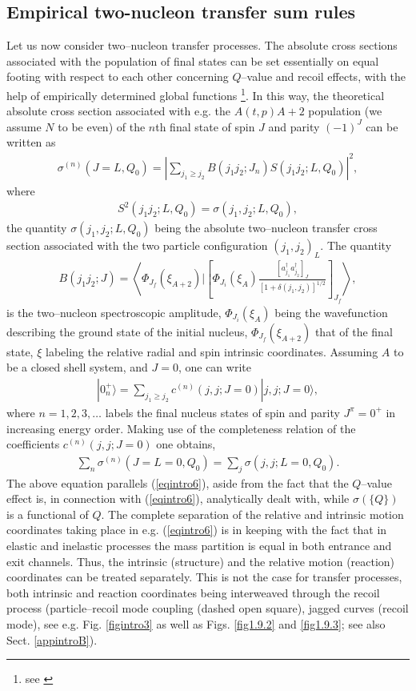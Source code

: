 \subsection{Empirical two-nucleon transfer sum rules}\label{S2.2.1}
Let us now consider two--nucleon transfer  processes. The  absolute cross sections associated with the population of  final states can be set essentially on equal footing with respect to each other  concerning  $Q$--value and recoil effects, with the help of empirically determined global functions \footnote{see \cite{Broglia:72b}}. In this way, the theoretical absolute cross section associated with e.g. the $A(t,p)A+2$ population (we assume $N$ to be even) of the $n$th final state of spin $J$ and parity $(-1)^J$ can be written as 
\begin{align}
\sigma^{(n)}(J=L,Q_0)=\left|\sum_{j_1\geq j_2}B(j_1 j_2;J_n)S(j_1 j_2 ;L,Q_0)\right|^2,
\end{align}
where
\begin{align}
S^2(j_1 j_2 ;L,Q_0)=\sigma(j_1,j_2;L,Q_0),
\end{align}
the quantity $\sigma(j_1,j_2;L,Q_0)$ being the absolute two--nucleon transfer cross section associated with the two particle configuration $(j_1,j_2)_L$.
The quantity
\begin{align}
B(j_1j_2;J)=\left\langle \Phi_{J_f}(\xi_{A+2})|\left[\Phi_{J_i}(\xi_A)\frac{\left[a^\dagger_{j_1}a^\dagger_{j_2}\right]_J}{\left[1+\delta(j_1,j_2)\right]^{1/2}}\right]_{J_f}\right\rangle,
\end{align}
is the two--nucleon spectroscopic amplitude, $\Phi_{J_i}(\xi_A)$ being the wavefunction describing the ground state of the initial nucleus, $\Phi_{J_f}(\xi_{A+2})$ that of the final state, $\xi$ labeling the relative radial and spin intrinsic coordinates. Assuming $A$ to be a closed shell system, and $J=0$, one can write
\begin{align}
|0^+_n\rangle=\sum_{j_1\geq j_2}c^{(n)}(j,j;J=0)|j,j;J=0\rangle,
\end{align}
where $n=1,2,3,\dots$ labels the final nucleus states of spin and parity $J^\pi=0^+$ in increasing energy order. Making use of the completeness relation of the coefficients $c^{(n)}(j,j;J=0)$ one obtains,
\begin{align}\label{eqintro12}
\sum_n \sigma^{(n)}(J=L=0,Q_0)=\sum_j\sigma(j,j;L=0,Q_0).
\end{align}
The above equation parallels (\ref{eqintro6}), aside from the fact that the $Q$--value effect is, in connection with (\ref{eqintro6}), analytically dealt with, while $\sigma(\{Q\})$ is a functional of $Q$. The complete separation of the relative and intrinsic motion coordinates taking place in e.g. (\ref{eqintro6}) is in keeping with the fact that in elastic and inelastic processes the mass partition is equal in both entrance and exit channels. Thus, the intrinsic (structure) and the relative motion (reaction) coordinates can be treated separately. This is not the case for transfer processes, both intrinsic and reaction coordinates being interweaved through the recoil process (particle--recoil mode coupling (dashed open square),  jagged curves (recoil mode), see e.g.  Fig.  \ref{figintro3} as well as Figs. \ref{fig1.9.2} and \ref{fig1.9.3}; see also Sect. \ref{appintroB}). 

